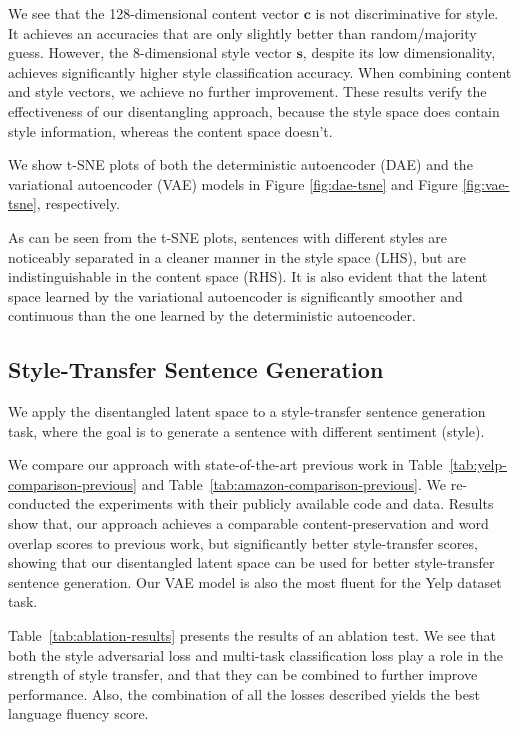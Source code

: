 \documentclass[11pt,a4paper]{article}
\begin{document}
We see that the 128-dimensional content vector $\bm c$ is not discriminative for style. It achieves an accuracies that are only slightly better than random/majority guess. However, the 8-dimensional style vector $\bm s$, despite its low dimensionality, achieves significantly higher style classification accuracy. When combining content and style vectors, we achieve no further improvement. These results verify the effectiveness of our disentangling approach, because the style space does contain style information, whereas the content space doesn't.

We show t-SNE plots of both the deterministic autoencoder (DAE) and the variational autoencoder (VAE) models in Figure \ref{fig:dae-tsne} and Figure \ref{fig:vae-tsne}, respectively.


As can be seen from the t-SNE plots, sentences with different styles are noticeably separated in a cleaner manner in the style space (LHS), but are indistinguishable in the content space (RHS). It is also evident that the latent space learned by the variational autoencoder is significantly smoother and continuous than the one learned by the deterministic autoencoder.


\subsection{Style-Transfer Sentence Generation}

We apply the disentangled latent space to a style-transfer sentence generation task, where the goal is to generate a sentence with different sentiment (style).

We compare our approach with state-of-the-art previous work in Table~\ref{tab:yelp-comparison-previous} and Table~\ref{tab:amazon-comparison-previous}. We re-conducted the experiments with their publicly available code and data.
Results show that, our approach achieves a comparable content-preservation and word overlap scores to previous work, but significantly better style-transfer scores, showing that our disentangled latent space can be used for better style-transfer sentence generation. Our VAE model is also the most fluent for the Yelp dataset task.

Table~\ref{tab:ablation-results} presents the results of an ablation test. We see that both the style adversarial loss and multi-task classification loss play a role in the strength of style transfer, and that they can be combined to further improve performance. Also, the combination of all the losses described yields the best language fluency score.
\end{document}
